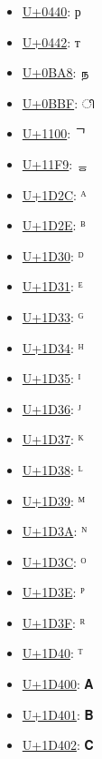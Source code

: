 \begin{itemize}
	\item \href{https://www.compart.com/en/unicode/U+0440}{U+0440}: р
	\item \href{https://www.compart.com/en/unicode/U+0442}{U+0442}: т
	\item \href{https://www.compart.com/en/unicode/U+0BA8}{U+0BA8}: ந
	\item \href{https://www.compart.com/en/unicode/U+0BBF}{U+0BBF}: ி
	\item \href{https://www.compart.com/en/unicode/U+1100}{U+1100}: ᄀ
	\item \href{https://www.compart.com/en/unicode/U+11F9}{U+11F9}: ᇹ
	\item \href{https://www.compart.com/en/unicode/U+1D2C}{U+1D2C}: ᴬ
	\item \href{https://www.compart.com/en/unicode/U+1D2E}{U+1D2E}: ᴮ
	\item \href{https://www.compart.com/en/unicode/U+1D30}{U+1D30}: ᴰ
	\item \href{https://www.compart.com/en/unicode/U+1D31}{U+1D31}: ᴱ
	\item \href{https://www.compart.com/en/unicode/U+1D33}{U+1D33}: ᴳ
	\item \href{https://www.compart.com/en/unicode/U+1D34}{U+1D34}: ᴴ
	\item \href{https://www.compart.com/en/unicode/U+1D35}{U+1D35}: ᴵ
	\item \href{https://www.compart.com/en/unicode/U+1D36}{U+1D36}: ᴶ
	\item \href{https://www.compart.com/en/unicode/U+1D37}{U+1D37}: ᴷ
	\item \href{https://www.compart.com/en/unicode/U+1D38}{U+1D38}: ᴸ
	\item \href{https://www.compart.com/en/unicode/U+1D39}{U+1D39}: ᴹ
	\item \href{https://www.compart.com/en/unicode/U+1D3A}{U+1D3A}: ᴺ
	\item \href{https://www.compart.com/en/unicode/U+1D3C}{U+1D3C}: ᴼ
	\item \href{https://www.compart.com/en/unicode/U+1D3E}{U+1D3E}: ᴾ
	\item \href{https://www.compart.com/en/unicode/U+1D3F}{U+1D3F}: ᴿ
	\item \href{https://www.compart.com/en/unicode/U+1D40}{U+1D40}: ᵀ
	\item \href{https://www.compart.com/en/unicode/U+1D400}{U+1D400}: 𝐀
	\item \href{https://www.compart.com/en/unicode/U+1D401}{U+1D401}: 𝐁
	\item \href{https://www.compart.com/en/unicode/U+1D402}{U+1D402}: 𝐂

\end{itemize}
